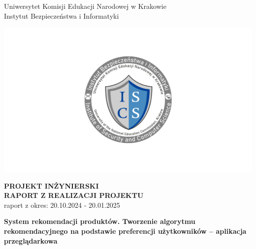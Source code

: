 \documentclass[12pt,a4paper,oneside]{article}
\theoremstyle{definition}
\numberwithin{equation}{section}
\begin{document}

\thispagestyle{empty}
\begin{titlepage}
\begin{center}\Large
Uniwersytet Komisji Edukacji Narodowej w Krakowie\\
\large
Instytut Bezpieczeństwa i Informatyki\\
\vskip 10pt
\end{center}
\begin{center}
\centering \includegraphics[width=1.0\columnwidth]{images/logo.png}
\end{center}

\begin{center}
 {\bf \fontsize{14pt}{14pt}\selectfont PROJEKT INŻYNIERSKI \\ RAPORT Z REALIZACJI PROJEKTU\\
 }
 {\fontsize{12pt}{12pt} raport z okres: 20.10.2024 - 20.01.2025}
\end{center}
\vskip 5pt
\begin{center}
 {\bf \fontsize{12pt}{22pt}\selectfont System rekomendacji produktów. Tworzenie algorytmu rekomendacyjnego na
 podstawie preferencji użytkowników – aplikacja przeglądarkowa}
\end{center}


\end{titlepage}
\end{document}
